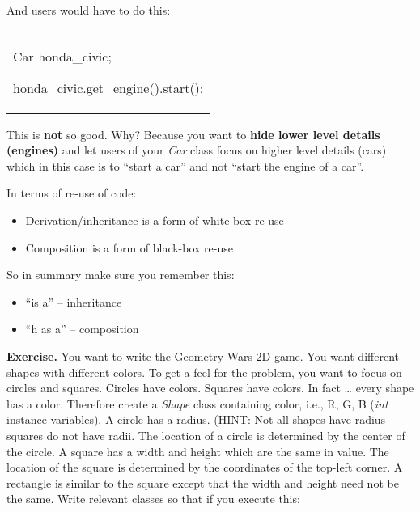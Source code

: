 \documentclass[
]{article}
\providecommand{\tightlist}{%
  \setlength{\itemsep}{0pt}\setlength{\parskip}{0pt}}
\begin{document}
And users would have to do this:

\begin{longtable}[]{@{}
  >{\raggedright\arraybackslash}p{}@{}}
\toprule\noalign{}
 \\
\midrule\noalign{}
\endhead
\bottomrule\noalign{}
\endlastfoot
Car honda\_civic;

honda\_civic.get\_engine().start(); \\
\end{longtable}

This is \textbf{not} so good. Why? Because you want to \textbf{hide
lower level details (engines)} and let users of your \emph{Car} class
focus on higher level details (cars) which in this case is to ``start a
car'' and not ``start the engine of a car''.

In terms of re-use of code:

\begin{itemize}
\tightlist
\item
  Derivation/inheritance is a form of white-box re-use
\item
  Composition is a form of black-box re-use
\end{itemize}

So in summary make sure you remember this:

\begin{itemize}
\tightlist
\item
  ``is a'' -- inheritance
\item
  ``h as a'' -- composition
\end{itemize}

\textbf{Exercise. }You want to write the Geometry Wars 2D game. You want
different shapes with different colors. To get a feel for the problem,
you want to focus on circles and squares. Circles have colors. Squares
have colors. In fact \ldots{} every shape has a color. Therefore create
a \emph{Shape} class containing color, i.e., R, G, B (\emph{int}
instance variables). A circle has a radius. (HINT: Not all shapes have
radius -- squares do not have radii. The location of a circle is
determined by the center of the circle. A square has a width and height
which are the same in value. The location of the square is determined by
the coordinates of the top-left corner. A rectangle is similar to the
square except that the width and height need not be the same. Write
relevant classes so that if you execute this:
\end{document}

